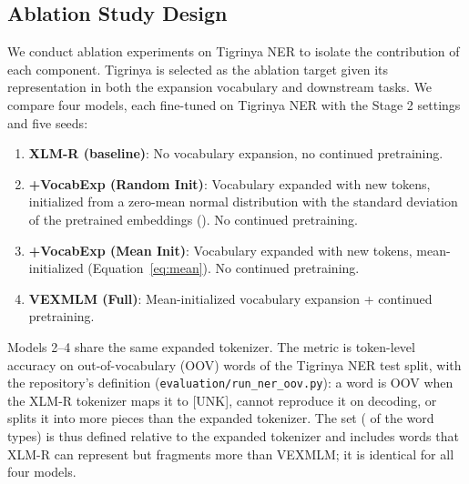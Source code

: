 \subsection{Ablation Study Design}
\label{sec:ablation_design}
We conduct ablation experiments on Tigrinya NER to isolate the contribution of each component. Tigrinya is selected as the ablation target given its representation in both the expansion vocabulary and downstream tasks. We compare four models, each fine-tuned on Tigrinya NER with the Stage 2 settings and five seeds:
\begin{enumerate}
    \item \textbf{XLM-R (baseline)}: No vocabulary expansion, no continued pretraining.
    \item \textbf{+VocabExp (Random Init)}: Vocabulary expanded with \vocabAdded{} new tokens, initialized from a zero-mean normal distribution with the standard deviation of the pretrained embeddings (\randInitStd). No continued pretraining.
    \item \textbf{+VocabExp (Mean Init)}: Vocabulary expanded with \vocabAdded{} new tokens, mean-initialized (Equation~\ref{eq:mean}). No continued pretraining.
    \item \textbf{VEXMLM (Full)}: Mean-initialized vocabulary expansion + continued pretraining.
\end{enumerate}
Models 2--4 share the same expanded tokenizer. The metric is token-level accuracy on out-of-vocabulary (OOV) words of the Tigrinya NER test split, with the repository's definition (\texttt{evaluation/run\_ner\_oov.py}): a word is OOV when the XLM-R tokenizer maps it to [UNK], cannot reproduce it on decoding, or splits it into more pieces than the expanded tokenizer. The set (\ablOOVTypes{} of the \ablWordTypes{} word types) is thus defined relative to the expanded tokenizer and includes words that XLM-R can represent but fragments more than VEXMLM; it is identical for all four models.
